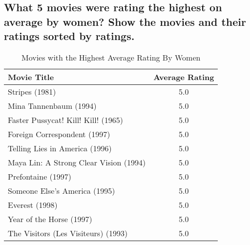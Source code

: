 \documentclass{article}
\begin{document}
\newpage
\subsection{What 5 movies were rating the highest on average by women? Show the movies and their ratings sorted by ratings.}

\begin{table}[!h]
\centering
\begin{tabular}{l c}
Movie Title & Average Rating \\
\hline
Stripes (1981) & 5.0  \\
Mina Tannenbaum (1994) & 5.0  \\
Faster Pussycat! Kill! Kill! (1965) & 5.0  \\
Foreign Correspondent (1997) & 5.0  \\
Telling Lies in America (1996) & 5.0  \\
Maya Lin: A Strong Clear Vision (1994) & 5.0  \\
Prefontaine (1997) & 5.0  \\
Someone Else's America (1995) & 5.0  \\
Everest (1998) & 5.0  \\
Year of the Horse (1997) & 5.0  \\
The Visitors (Les Visiteurs) (1993) & 5.0 \\
\hline
\end{tabular}
\caption{Movies with the Highest Average Rating By Women}
\end{table}
\end{document}
